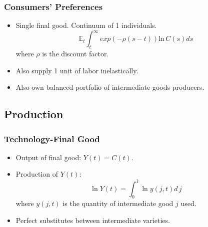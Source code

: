 \documentclass{beamer}
\begin{document}
\begin{frame}[t]\frametitle{Consumers' Preferences} 
  \begin{itemize}
    \item<+-> Single final good.  Continuum of 1 individuals.
      \begin{equation*} \label{eq:pref}
        \mathbb{E}_t \int_t^\infty exp(-\rho(s - t))\mathrm{ln}\,   C(s)ds
      \end{equation*}
      where $\rho$ is the discount factor.
      
  \item<+-> Also supply 1 unit of labor inelastically.
  \item<+-> Also own balanced portfolio of intermediate goods producers.
  \end{itemize}
\end{frame}

\subsection{Production}
\label{sub:production}

\begin{frame}[t]\frametitle{Technology-Final Good} 
  \begin{itemize}
    \item<+-> Output of final good: $Y(t) = C(t)$.
    
    \item<+-> Production of $Y(t)$:
      \begin{equation*} \label{eq:tech_output}
        \ln Y(t) = \int_{0}^{1} \ln y(j, t) d\,j 
      \end{equation*}
      where $y(j, t)$ is the quantity of intermediate good $j$ used.
    \item<+-> Perfect substitutes between intermediate varieties.
    
  \end{itemize}
\end{frame}
\end{document}
